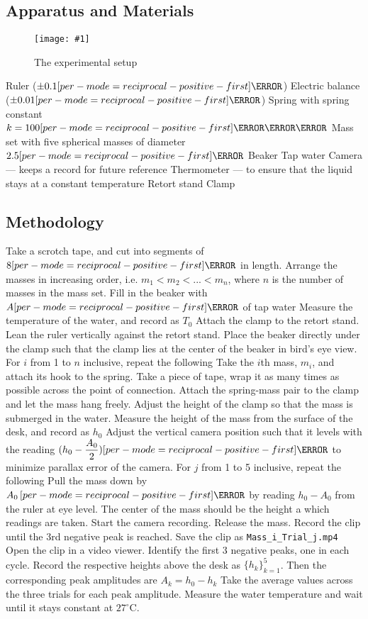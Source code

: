 \documentclass[a4paper,12pt]{article}
\let\oldsi\si
\renewcommand{\si}[1]{\oldsi[per-mode=reciprocal-positive-first]{#1}}
\newcommand{\degsym}{^{\circ}}
\newcommand{\img}[4]{\begin{center}
  \begin{figure}[H]
    \centering
    \texttt{[image: \#1]}
    \caption{#3}
    \label{fig:#4}
  \end{figure}
\end{center}}
\begin{document}
\pagebreak

\subsection{Apparatus and Materials}
\img{figs/setup.png}{0.8}{The experimental setup}{setup}
\begin{outline}[enumerate]
  \1 Ruler ($\pm 0.1\si{\cm}$)
  \1 Electric balance ($\pm 0.01\si{\g}$)
  \1 Spring with spring constant $k = 100\si{\N\per\m}$
  \1 Mass set with five spherical masses of diameter $2.5\si{\cm}$
  \1 Beaker
  \1 Tap water
  \1 Camera --- keeps a record for future reference
  \1 Thermometer --- to ensure that the liquid stays at a constant temperature
  \1 Retort stand
  \1 Clamp
\end{outline}

\subsection{Methodology}

\begin{outline}[enumerate]
  \1 Take a scrotch tape, and cut into segments of $8\si{\cm}$ in length.
  \1 Arrange the masses in increasing order, i.e. $m_1 < m_2 < ... < m_n$, where $n$ is the number of masses in the mass set.
  \1 Fill in the beaker with $A\si{\mL}$ of tap water
  \1 Measure the temperature of the water, and record as $T_0$
  \1 Attach the clamp to the retort stand.
  \1 Lean the ruler vertically against the retort stand.
  \1 Place the beaker directly under the clamp such that the clamp lies at the center of the beaker in bird's eye view.
  \1 For $i$ from 1 to $n$ inclusive, repeat the following
  \2 Take the $i$th mass, $m_i$, and attach its hook to the spring.
  \2 Take a piece of tape, wrap it as many times as possible across the point of connection.
  \2 Attach the spring-mass pair to the clamp and let the mass hang freely.
  \2 Adjust the height of the clamp so that the mass is submerged in the water.
  \2 Measure the height of the mass from the surface of the desk, and record as $h_0$
  \2 Adjust the vertical camera position such that it levels with the reading $(h_0 - \dfrac{A_0}{2}) \si{\cm}$ to minimize parallax error of the camera.
  \2 For $j$ from 1 to 5 inclusive, repeat the following
  \3 Pull the mass down by $A_0\,\si{\cm}$ by reading $h_0 - A_0$ from the ruler at eye level. The center of the mass should be the height a which readings are taken.
  \3 Start the camera recording.
  \3 Release the mass.
  \3 Record the clip until the 3rd negative peak is reached.
  \3 Save the clip as \verb|Mass_i_Trial_j.mp4|
  \3 Open the clip in a video viewer.
  \3 Identify the first 3 negative peaks, one in each cycle.
  \3 Record the respective heights above the desk as $\{h_k\}^{5}_{k=1}$.
  \3 Then the corresponding peak amplitudes are $A_k = h_0 - h_{k}$
  \2 Take the average values across the three trials for each peak amplitude.
  \2 Measure the water temperature and wait until it stays constant at $27\degsym \text{C}$.
\end{outline}
\end{document}
